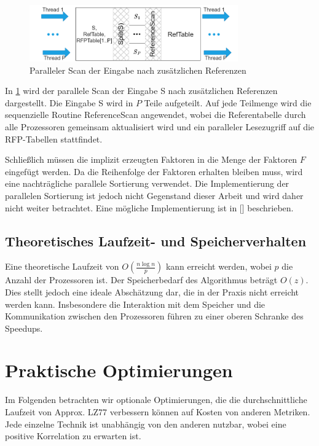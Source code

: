 \begin{figure}[h]
    \centering
    \includegraphics[width=0.8\textwidth]{Images/parallel_referencescan.png}
    \caption{Paralleler Scan der Eingabe nach zusätzlichen Referenzen}
    \label{fig:parrefscan}
\end{figure}
In \ref{fig:parrefscan} wird der parallele Scan der Eingabe S nach zusätzlichen Referenzen dargestellt. Die Eingabe S wird in $P$ Teile aufgeteilt. Auf jede Teilmenge wird die sequenzielle Routine
ReferenceScan angewendet, wobei die Referentabelle durch alle Prozessoren gemeinsam aktualisiert wird und ein paralleler Lesezugriff auf die RFP-Tabellen stattfindet. 

Schließlich müssen die implizit erzeugten Faktoren in die Menge der Faktoren $F$ eingefügt werden. Da die Reihenfolge der Faktoren erhalten bleiben muss, wird eine nachträgliche parallele Sortierung
verwendet. Die Implementierung der parallelen Sortierung ist jedoch nicht Gegenstand dieser Arbeit und wird daher nicht weiter betrachtet. Eine mögliche Implementierung ist in [] beschrieben.

\subsection{Theoretisches Laufzeit- und Speicherverhalten}
Eine theoretische Laufzeit von $O(\frac{n \log n}{p})$ kann erreicht werden, wobei $p$ die Anzahl der Prozessoren ist. Der Speicherbedarf des Algorithmus beträgt $O(z)$. Dies stellt jedoch eine
ideale Abschätzung dar, die in der Praxis nicht erreicht werden kann. Insbesondere die Interaktion mit dem Speicher und die Kommunikation zwischen den Prozessoren führen zu einer oberen Schranke
des Speedups.

\section{Praktische Optimierungen}
Im Folgenden betrachten wir optionale Optimierungen, die die durchschnittliche Laufzeit von Approx. LZ77 verbessern können auf Kosten von anderen Metriken. Jede einzelne Technik ist unabhängig von
den anderen nutzbar, wobei eine positive Korrelation zu erwarten ist.

